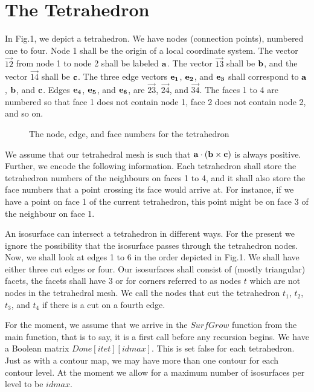 \documentclass[12pt]{article}
\begin{document}
\section{The Tetrahedron}
In Fig.1, we depict a tetrahedron. We have nodes (connection points), numbered one to four. Node
1 shall be the origin of a local coordinate system. The
vector $\vec{12}$ from node 1 to node 2 shall be labeled $\bf a$. The vector
$\vec{13}$ shall be $\bf b$, and the vector $\vec{14}$
shall be $\bf c$. The three edge  vectors $\bf e_1$, $\bf e_2$, and $\bf e_3$
shall correspond to $\bf a$, $\bf b$, and $\bf c$. Edges $\bf e_4$,
 $\bf e_5$, and $\bf e_6$, 
are $\vec{23}$, $\vec{24}$, and $\vec{34}$.
The faces 1 to 4 are numbered so that face 1 does not contain node 1,
 face 2 does not contain node 2, and so on.
\begin{figure}
\vspace*{14cm}
\caption{The node, edge, and face numbers for the tetrahedron}
\end{figure}

We assume that our tetrahedral mesh is such that ${\bf a} \cdot ( 
{\bf b} \times {\bf c})$ is always positive. Further, we encode
the following information. Each tetrahedron shall store the tetrahedron
numbers of the neighbours on faces 1 to 4, and it shall also store
the face numbers that a point crossing its face would arrive at.
For instance, if we have a point on face 1 of the current tetrahedron, this
point might be on face 3 of the neighbour on face 1. 

An isosurface can intersect a tetrahedron in different ways. For
the present we ignore the possibility that the isosurface  passes
through the tetrahedron nodes. Now, we shall look at edges 1 to 6
in the order depicted in Fig.1. We shall have either three cut
edges or four. Our isosurfaces shall consist of (mostly triangular) facets,
 the facets shall have 3 or for corners referred to as nodes $t$ which
are not nodes in the tetrahedral mesh. We call the nodes
 that cut the tetrahedron  $t_1$, $t_2$, $t_3$, and  $t_4$ if there
is a cut on a fourth edge.

For the moment, we assume that we arrive in the $SurfGrow$ function
from the main function, that is to say, it is a first call before
any recursion begins. We have a Boolean matrix  $Done[itet][idmax]$.
This is set false for each tetrahedron. Just as with a contour map,
 we may have more than one contour for each contour level. At the
moment we allow for a maximum number of isosurfaces per level
to be $idmax$.
\end{document}
